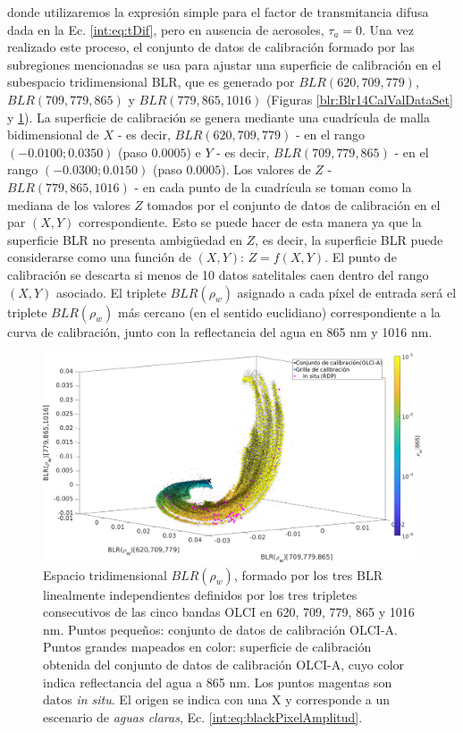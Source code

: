         \noindent donde utilizaremos la expresión simple para el factor de transmitancia difusa dada en la Ec. \ref{int:eq:tDif}, pero en ausencia de aerosoles, $\tau_{a}=0$. Una vez realizado este proceso, el conjunto de datos de calibración formado por las subregiones mencionadas se usa para ajustar una superficie de calibración en el subespacio tridimensional BLR, que es generado por $BLR(620,709,779)$, $BLR(709,779,865)$ y $BLR(779,865,1016)$ (Figuras \ref{blr:Blr14CalValDataSet} y \ref{blr:blr3d}). La superficie de calibración se genera mediante una cuadrícula de malla bidimensional de $X$ - es decir, $BLR(620,709,779)$ - en el rango $(-0.0100;0.0350)$ (paso $0.0005$) e $Y$ - es decir, $BLR(709,779,865)$ - en el rango $(-0.0300;0.0150)$ (paso $0.0005$). Los valores de $Z$ - $BLR(779,865,1016)$ - en cada punto de la cuadrícula se toman como la mediana de los valores $Z$ tomados por el conjunto de datos de calibración en el par $(X,Y)$ correspondiente. Esto se puede hacer de esta manera ya que la superficie BLR no presenta ambigüedad en $Z$, es decir, la superficie BLR puede considerarse como una función de $(X,Y)$: $Z=f(X,Y)$. El punto de calibración se descarta si menos de 10 datos satelitales caen dentro del rango $(X,Y)$ asociado.
        El triplete $BLR(\rho_{w})$ asignado a cada píxel de entrada será el triplete $BLR(\rho_{w})$ más cercano (en el sentido euclidiano) correspondiente a la curva de calibración, junto con la reflectancia del agua en 865 nm y 1016 nm.
        
        \begin{figure}
        \centering
        \includegraphics[width=\textwidth]{blr/figures/blr3D}
        \caption[Espacio tridimensional $BLR(\rho_{w})$, formado por los tres BLR linealmente independientes definidos por los tres tripletes consecutivos de las cinco bandas OLCI en 620, 709, 779, 865 y 1016 nm.]{Espacio tridimensional $BLR(\rho_{w})$, formado por los tres BLR linealmente independientes definidos por los tres tripletes consecutivos de las cinco bandas OLCI en 620, 709, 779, 865 y 1016 nm. Puntos pequeños: conjunto de datos de calibración OLCI-A. Puntos grandes mapeados en color: superficie de calibración obtenida del conjunto de datos de calibración OLCI-A, cuyo color indica reflectancia del agua a 865 nm. Los puntos magentas son datos \textit{in situ}. El origen se indica con una X y corresponde a un escenario de \textit{aguas claras}, Ec. \ref{int:eq:blackPixelAmplitud}.}
        \label{blr:blr3d}
        \end{figure}

